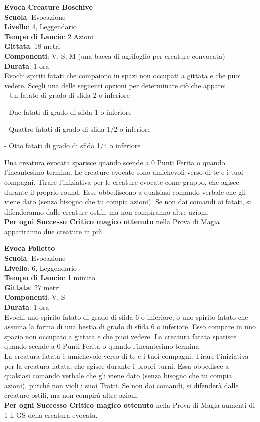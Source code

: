 \begin{multicols}{2}
\medskip\textbf{Evoca Creature Boschive}\\
\textbf{Scuola}: Evocazione\\
\textbf{Livello}: 4, Leggendario\\
\textbf{Tempo di Lancio}: 2 Azioni\\
\textbf{Gittata}: 18 metri\\
\textbf{Componenti}: V, S, M (una bacca di agrifoglio per creature convocata)\\
\textbf{Durata}: 1 ora \\
Evochi spiriti fatati che compaiono in spazi non occupati a gittata e che puoi vedere. Scegli una delle seguenti opzioni per determinare ciò che appare:\\

- Un fatato di grado di sfida 2 o inferiore

- Due fatati di grado di sfida 1 o inferiore

- Quattro fatati di grado di sfida 1/2 o inferiore

- Otto fatati di grado di sfida 1/4 o inferiore

\medskip
Una creatura evocata sparisce quando scende a 0 Punti Ferita o quando l'incantesimo termina. Le creature evocate sono amichevoli verso di te e i tuoi compagni. Tirare l'iniziativa per le creature evocate come gruppo, che agisce durante il proprio round. Esse obbediscono a qualsiasi comando verbale che gli viene dato (senza bisogno che tu compia azioni). Se non dai comandi ai fatati, si difenderanno dalle creature ostili, ma non compiranno altre azioni.\\
\textbf{Per ogni Successo Critico magico ottenuto} nella Prova di Magia appariranno due creature in più.

\medskip\textbf{Evoca Folletto}\\
\textbf{Scuola}: Evocazione\\
\textbf{Livello}: 6, Leggendario\\
\textbf{Tempo di Lancio}: 1 minuto\\
\textbf{Gittata}: 27 metri\\
\textbf{Componenti}: V, S\\
\textbf{Durata}: 1 ora \\
Evochi uno spirito fatato di grado di sfida 6 o inferiore, o uno spirito fatato che assuma la forma di una bestia di grado di sfida 6 o inferiore. Esso compare in uno spazio non occupato a gittata e che puoi vedere. La creatura fatata sparisce quando scende a 0 Punti Ferita o quando l'incantesimo termina.\\
La creatura fatata è amichevole verso di te e i tuoi compagni. Tirare l'iniziativa per la creatura fatata, che agisce durante i propri turni. Essa obbedisce a qualsiasi comando verbale che gli viene dato (senza bisogno che tu compia azioni), purché non violi i suoi Tratti. Se non dai comandi, si difenderà dalle creature ostili, ma non compirà altre azioni.\\
\textbf{Per ogni Successo Critico magico ottenuto} nella Prova di Magia aumenti di 1 il GS della creatura evocata.


\end{multicols}
